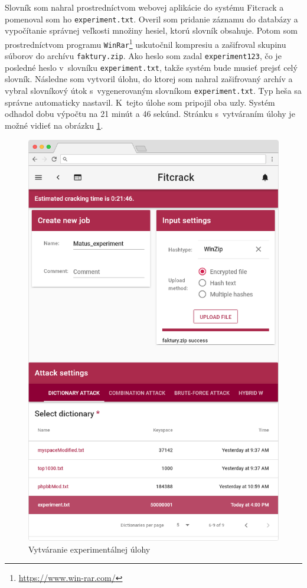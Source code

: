 \documentclass[slovak]{fitthesis}
\begin{document}
\noindent
Slovník som nahral prostredníctvom webovej aplikácie do systému Fitcrack a pomenoval som ho \texttt{experiment.txt}. Overil som pridanie záznamu do databázy a vypočítanie správnej veľkosti množiny hesiel, ktorú slovník obsahuje. Potom som prostredníctvom programu \texttt{WinRar}\footnote{\url{https://www.win-rar.com/}} uskutočnil kompresiu a zašifroval skupinu súborov do archívu \texttt{faktury.zip}. Ako heslo som zadal \texttt{experiment123}, čo je posledné heslo v~slovníku \texttt{experiment.txt}, takže systém bude musieť prejsť celý slovník. Následne som vytvoril úlohu, do ktorej som nahral zašifrovaný archív a vybral slovníkový útok s~vygenerovaným slovníkom \texttt{experiment.txt}. Typ heša sa správne automaticky nastavil. K~tejto úlohe som pripojil oba uzly. Systém odhadol dobu výpočtu na 21 minút a 46 sekúnd. Stránku s~vytváraním úlohy je možné vidieť na obrázku \ref{fig:exp1}. 
\begin{figure}[H]
    \centering
    \includegraphics[scale=0.4]{obrazky/exp1Frame.PNG}
    \caption{Vytváranie experimentálnej úlohy}
    \label{fig:exp1}
\end{figure}
\end{document}
